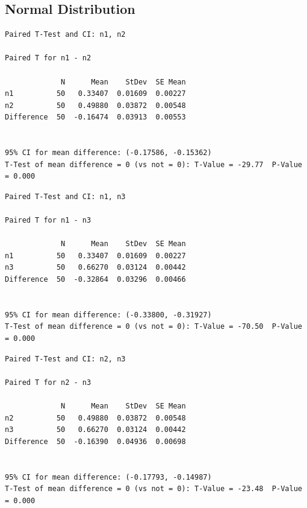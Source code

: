 \documentclass[letterpaper,10pt]{article}
\begin{document}
\subsection{Normal Distribution}
\begin{samepage}
\begin{verbatim}
Paired T-Test and CI: n1, n2 

Paired T for n1 - n2

             N      Mean    StDev  SE Mean
n1          50   0.33407  0.01609  0.00227
n2          50   0.49880  0.03872  0.00548
Difference  50  -0.16474  0.03913  0.00553


95% CI for mean difference: (-0.17586, -0.15362)
T-Test of mean difference = 0 (vs not = 0): T-Value = -29.77  P-Value = 0.000
\end{verbatim}
\end{samepage}
\begin{samepage}
\begin{verbatim}
Paired T-Test and CI: n1, n3 

Paired T for n1 - n3

             N      Mean    StDev  SE Mean
n1          50   0.33407  0.01609  0.00227
n3          50   0.66270  0.03124  0.00442
Difference  50  -0.32864  0.03296  0.00466


95% CI for mean difference: (-0.33800, -0.31927)
T-Test of mean difference = 0 (vs not = 0): T-Value = -70.50  P-Value = 0.000
\end{verbatim}
\end{samepage}
\begin{samepage}
\begin{verbatim}
Paired T-Test and CI: n2, n3 

Paired T for n2 - n3

             N      Mean    StDev  SE Mean
n2          50   0.49880  0.03872  0.00548
n3          50   0.66270  0.03124  0.00442
Difference  50  -0.16390  0.04936  0.00698


95% CI for mean difference: (-0.17793, -0.14987)
T-Test of mean difference = 0 (vs not = 0): T-Value = -23.48  P-Value = 0.000
\end{verbatim}
\end{samepage}
\end{document}
